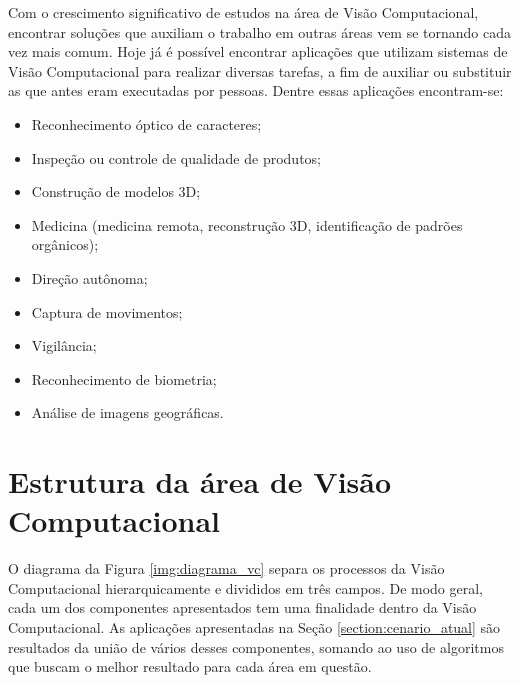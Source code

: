Com o crescimento significativo de estudos na área de Visão Computacional, encontrar soluções que auxiliam o trabalho em outras áreas vem se tornando cada vez mais comum. Hoje já é possível encontrar aplicações que utilizam sistemas de Visão Computacional para realizar diversas tarefas, a fim de auxiliar ou substituir as que antes eram executadas por pessoas. Dentre essas aplicações encontram-se:

\begin{itemize}
    \item{Reconhecimento óptico de caracteres;}
    \item{Inspeção ou controle de qualidade de produtos;}
    \item{Construção de modelos 3D;}
    \item{Medicina (medicina remota, reconstrução 3D, identificação de padrões orgânicos);}
    \item{Direção autônoma;}
    \item{Captura de movimentos;}
    \item{Vigilância;}
    \item{Reconhecimento de biometria;}
    \item{Análise de imagens geográficas.}
\end{itemize}

\section{Estrutura da área de Visão Computacional}

O diagrama da Figura \ref{img:diagrama_vc} separa os processos da Visão Computacional hierarquicamente e divididos em três campos. De modo geral, cada um dos componentes apresentados tem uma finalidade dentro da Visão Computacional. As aplicações apresentadas na Seção \ref{section:cenario_atual} são resultados da união de vários desses componentes, somando ao uso de algoritmos que buscam o melhor resultado para cada área em questão.

